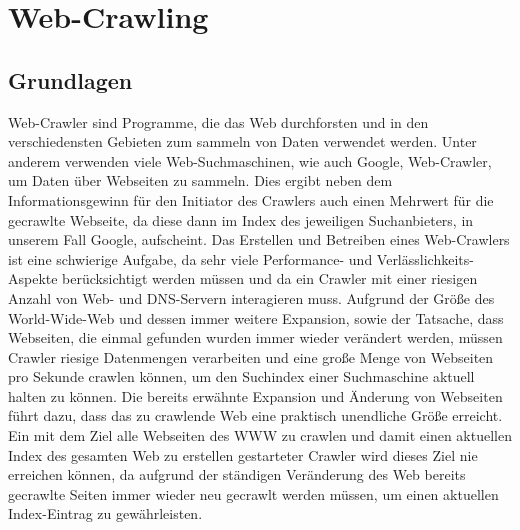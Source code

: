 \documentclass[12pt, a4paper]{llncs}
\begin{document}
	\section{Web-Crawling}\label{sec:google}
	\subsection{Grundlagen}
	Web-Crawler sind Programme, die das Web durchforsten und in den verschiedensten Gebieten zum sammeln von Daten
	verwendet werden. Unter anderem verwenden viele Web-Suchmaschinen, wie auch Google, Web-Crawler, um Daten
	über Webseiten zu sammeln. Dies ergibt neben dem Informationsgewinn für den Initiator des Crawlers auch einen
	Mehrwert für die gecrawlte Webseite, da diese dann im Index des jeweiligen Suchanbieters, in unserem Fall Google,
	aufscheint\cite{giles10}.
	Das Erstellen und Betreiben eines Web-Crawlers ist eine schwierige Aufgabe, da sehr viele Performance- und Verlässlichkeits-
	Aspekte berücksichtigt werden müssen und da ein Crawler mit einer riesigen Anzahl von Web- und DNS-Servern interagieren
	muss\cite{page98}.
	Aufgrund der Größe des World-Wide-Web und dessen immer weitere Expansion, sowie der Tatsache, dass Webseiten, die
	einmal gefunden wurden immer wieder verändert werden, müssen Crawler riesige Datenmengen verarbeiten und eine große
	Menge von Webseiten pro Sekunde crawlen können, um den Suchindex einer Suchmaschine aktuell halten zu können.\cite{hafri04}
	Die bereits erwähnte Expansion und Änderung von Webseiten führt dazu, dass das zu crawlende Web eine praktisch unendliche
	Größe erreicht. Ein mit dem Ziel alle Webseiten des WWW zu crawlen und damit einen aktuellen Index des gesamten Web zu erstellen
	gestarteter Crawler wird dieses Ziel nie erreichen können, da aufgrund der ständigen Veränderung des Web bereits gecrawlte
	Seiten immer wieder neu gecrawlt werden müssen, um einen aktuellen Index-Eintrag zu gewährleisten.\cite{yates05}
	
\end{document}
